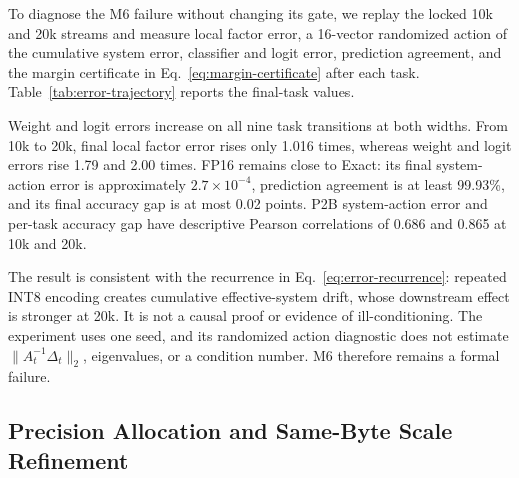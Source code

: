 \documentclass[runningheads]{llncs}
\begin{document}
To diagnose the M6 failure without changing its gate, we replay the locked
10k and 20k streams and measure local factor error, a 16-vector randomized
action of the cumulative system error, classifier and logit error, prediction
agreement, and the margin certificate in Eq.~\ref{eq:margin-certificate} after
each task. Table~\ref{tab:error-trajectory} reports the final-task values.

\begin{table}
\caption{Final-task P2B error trajectory on the train-only RanPAC stream.
System error is a randomized relative action estimate, not a matrix norm.}
\label{tab:error-trajectory}
\centering
\small
{}
\end{table}

Weight and logit errors increase on all nine task transitions at both widths.
From 10k to 20k, final local factor error rises only 1.016 times, whereas
weight and logit errors rise 1.79 and 2.00 times. FP16 remains close to Exact:
its final system-action error is approximately $2.7\times10^{-4}$, prediction
agreement is at least 99.93\%, and its final accuracy gap is at most 0.02
points. P2B system-action error and per-task accuracy gap have descriptive
Pearson correlations of 0.686 and 0.865 at 10k and 20k.

The result is consistent with the recurrence in
Eq.~\ref{eq:error-recurrence}: repeated INT8 encoding creates cumulative
effective-system drift, whose downstream effect is stronger at 20k. It is not
a causal proof or evidence of ill-conditioning. The experiment uses one seed,
and its randomized action diagnostic does not estimate
$\|A_t^{-1}\Delta_t\|_2$, eigenvalues, or a condition number. M6 therefore
remains a formal failure.

\subsection{Precision Allocation and Same-Byte Scale Refinement}
\end{document}
